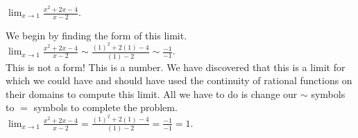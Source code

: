 \documentclass{ximera}
\begin{document}
\begin{example}
$\lim_{x\to1}\frac{x^2+2x-4}{x-2}$. 
\begin{solution}
We begin by finding the form of this limit. \\ $\lim_{x\to1}\frac{x^2+2x-4}{x-2} \sim \frac{(1)^2+2(1)-4}{(1)-2} \sim \frac{-1}{-1}$. \\
This is not a form!  This is a number.  We have discovered that this is a limit for which we could have and should have used the continuity of rational functions on their domains to compute this limit.  All we have to do is change our $\sim$ symbols to $=$ symbols to complete the problem.  \\
$\lim_{x\to1}\frac{x^2+2x-4}{x-2} = \frac{(1)^2+2(1)-4}{(1)-2} = \frac{-1}{-1} =1$.
\end{solution}
\end{example}
\end{document}
